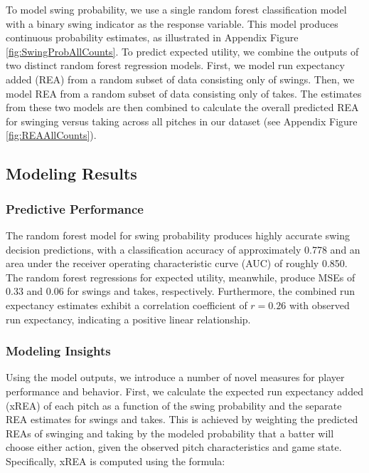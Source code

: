 \documentclass[12pt]{article}
\numberwithin{equation}{section}
\begin{document}
\vspace{5mm} %

To model swing probability, we use a single random forest classification model with a binary swing indicator as the response variable. This model produces continuous probability estimates, as illustrated in Appendix Figure \ref{fig:SwingProbAllCounts}. To predict expected utility, we combine the outputs of two distinct random forest regression models. First, we model run expectancy added (REA) from a random subset of data consisting only of swings. Then, we model REA from a random subset of data consisting only of takes. The estimates from these two models are then combined to calculate the overall predicted REA for swinging versus taking across all pitches in our dataset (see Appendix Figure \ref{fig:REAAllCounts}).

\subsection{Modeling Results}

\subsubsection{Predictive Performance}

The random forest model for swing probability produces highly accurate swing decision predictions, with a classification accuracy of approximately 0.778 and an area under the receiver operating characteristic curve (AUC) of roughly 0.850. The random forest regressions for expected utility, meanwhile, produce MSEs of 0.33 and 0.06 for swings and takes, respectively. Furthermore, the combined run expectancy estimates exhibit a correlation coefficient of $r = 0.26$ with observed run expectancy, indicating a positive linear relationship.

\subsubsection{Modeling Insights}

Using the model outputs, we introduce a number of novel measures for player performance and behavior. First, we calculate the expected run expectancy added (xREA) of each pitch as a function of the swing probability and the separate REA estimates for swings and takes. This is achieved by weighting the predicted REAs of swinging and taking by the modeled probability that a batter will choose either action, given the observed pitch characteristics and game state. Specifically, xREA is computed using the formula:
\end{document}
